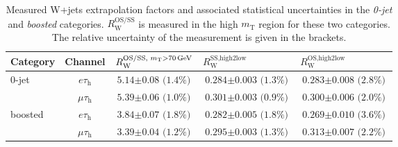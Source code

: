 \begin{table}[h!]
    \centering
    \caption[Measured W+jets extrapolation factors and associated statistical uncertainties in the \textit{0-jet} and \textit{boosted} categories.]{Measured W+jets extrapolation factors and associated statistical uncertainties in the \textit{0-jet} and \textit{boosted} categories. $R_\text{W}^\text{OS/SS}$ is measured in the high $m_\text{T}$ region for these two categories. The relative uncertainty of the measurement is given in the brackets.}\label{tab:etmt_wj:wj_factors_0jet1jet}
    \begin{tabular}{lclll}
        \toprule
         Category              & Channel    & $R_\text{W}^{\text{OS/SS, }m_\text{T}>\text{70\,GeV}}$         & $R_\text{W}^\text{SS,high2low}$ & $R_\text{W}^\text{OS,high2low}$\\ \hline
        \multirow{2}{*}{0-jet} & $e\tau_\text{h}$   & {\footnotesize $\text{5.14} \pm \text{0.08 (1.4\%)}$ }& {\footnotesize $\text{0.284} \pm \text{0.003 (1.3\%)}$ }       & {\footnotesize $\text{0.283} \pm \text{0.008 (2.8\%)}$ }      \\
                               & $\mu\tau_\text{h}$ & {\footnotesize $\text{5.39} \pm \text{0.06 (1.0\%)}$ }& {\footnotesize $\text{0.301} \pm \text{0.003 (0.9\%)}$ }       & {\footnotesize $\text{0.300} \pm \text{0.006 (2.0\%)}$ }      \\
        \multirow{2}{*}{boosted}& $e\tau_\text{h}$   &{\footnotesize  $\text{3.84} \pm \text{0.07 (1.8\%)}$} &{\footnotesize  $\text{0.282} \pm \text{0.005 (1.8\%)}$}        &{\footnotesize  $\text{0.269} \pm \text{0.010 (3.6\%)}$}       \\
                               & $\mu\tau_\text{h}$ & {\footnotesize $\text{3.39} \pm \text{0.04 (1.2\%)}$ }& {\footnotesize $\text{0.295} \pm \text{0.003 (1.3\%)}$ }       & {\footnotesize $\text{0.313} \pm \text{0.007 (2.2\%)}$ }      \\
    \end{tabular}%
\end{table}%

